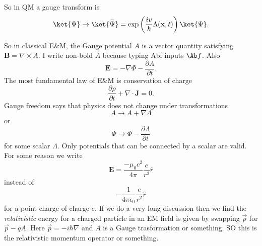 
So in QM a gauge transform is
\[
	\ket{\Psi }\to \ket{\widetilde{\Psi } }=\exp \left( \frac{iv}{\hbar} \Lambda (\mathbf{x} ,t) \right) \ket{\Psi }
.\]

So in classical E\&M, the Gauge potential $A$ is a vector quantity satisfying $\mathbf{B} =\nabla \times A$. I write non-bold $A$ because typing Abf inputs $\Ab f$. Also
\[
	\mathbf{E} =-\nabla \Phi - \frac{\partial A}{\partial t} 
.\]
The most fundamental law of E\&M is conservation of charge
\[
	\frac{\partial \rho }{\partial t} +\nabla \cdot \mathbf{J} =0
.\]
Gauge freedom says that physics does not change under transformations
\[
	A\to A+\nabla \Lambda 
\]
or
\[
	\Phi \to \Phi  -\frac{\partial \Lambda }{\partial t} 
\]
for some scalar $\Lambda $. Only potentials that can be connected by a scalar are valid. For some reason we write
\[
	\mathbf{E} =\frac{-\mu_0 c^2}{4\pi } \frac{e}{r^2} \hat{r} 
\]
instead of
\[
	-\frac{1}{4\pi \epsilon _0} \frac{e}{r^2} \hat{r} 
\]
for a point charge of charge $e$. If we do a very long discussion then we find the \emph{relativistic} energy for a charged particle in an EM field is given by swapping $\vec{p} $ for $\vec{p} -qA$.  Here $\vec{p} =-i\hbar \nabla $ and $A$ is a Gauge trasformation or something. SO this is the relativistic momentum operator or something.
